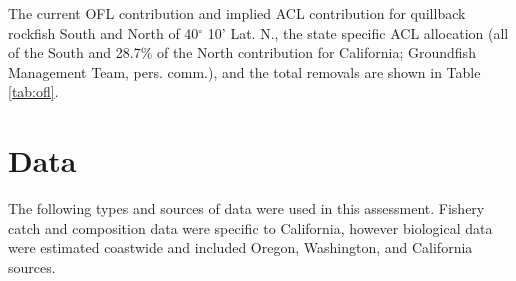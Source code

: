 \documentclass[11pt,
  english,
  letterpaper,
]{article}
\begin{document}
\leavevmode\tagmcend\tagstructend\par


The current OFL contribution and implied ACL contribution for quillback rockfish South and North of 40{\(^\circ\)\leavevmode\tagmcend\tagstructend} 10' Lat. N., the state specific ACL allocation (all of the South and 28.7\% of the North contribution for California; Groundfish Management Team, pers. comm.), and the total removals are shown in Table \ref{tab:ofl}.

\leavevmode\tagmcend\tagstructend\par


\hypertarget{data}{%
\section{Data}\label{data}}

\leavevmode\tagmcend\tagstructend


The following types and sources of data were used in this assessment. Fishery catch and composition data were specific to California, however biological data were estimated coastwide and included Oregon, Washington, and California sources.

\leavevmode\tagmcend\tagstructend\par

\end{document}
